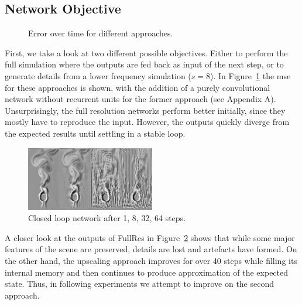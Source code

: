 \documentclass[sigconf]{acmart}
\begin{document}
\subsection{Network Objective}\label{sec:eva:objective}
\begin{figure}
	\caption{Error over time for different approaches.}
	\label{objectiveError}
\end{figure}
First, we take a look at two different possible objectives. Either to perform the full simulation where the outputs are fed back as input of the next step, or to generate details from a lower frequency simulation ($s=8$).
In Figure~\ref{objectiveError} the mse for these approaches is shown, with the addition of a purely convolutional network without recurrent units for the former approach (see Appendix A). Unsurprisingly, the full resolution networks perform better initially, since they mostly have to reproduce the input. However, the outputs quickly diverge from the expected results until settling in a stable loop.
\begin{figure}
	\includegraphics[width=0.5\textwidth]{imgs/fullres_series.png}
	\caption{Closed loop network after 1, 8, 32, 64 steps.}
	\label{closedLoop}
\end{figure}
A closer look at the outputs of FullRes in Figure~\ref{closedLoop} shows that while some major features of the scene are preserved, details are lost and artefacts have formed. On the other hand, the upscaling approach improves for over 40 steps while filling its internal memory and then continues to produce approximation of the expected state. Thus, in following experiments we attempt to improve on the second approach.
\end{document}
